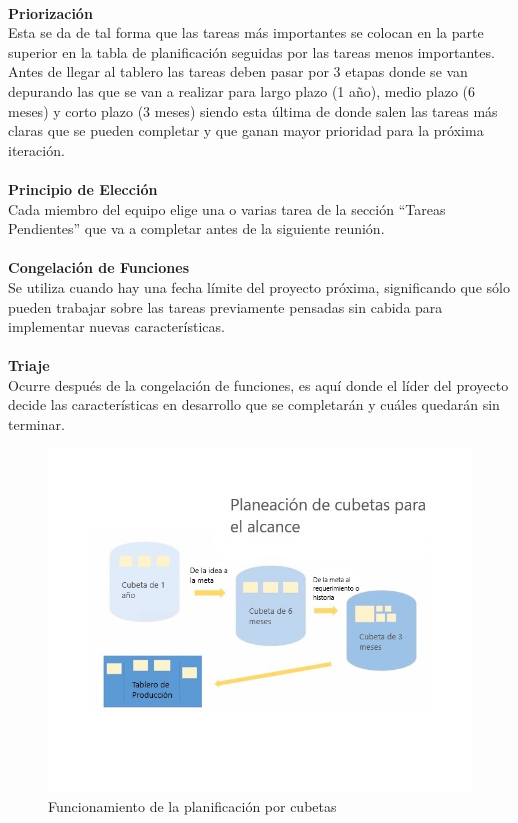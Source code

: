 \documentclass[12pt, a4paper, titlepage]{report}
\begin{document}
	    \\
	     \textbf{Priorización}\\
	    Esta se da de tal forma que las tareas más importantes se colocan en la parte superior en la tabla de planificación seguidas por las tareas menos importantes.\\
	    Antes de llegar al tablero las tareas deben pasar por 3 etapas donde se van depurando las que se van a realizar para largo plazo (1 año), medio plazo (6 meses) y corto plazo (3 meses) siendo esta última de donde salen las tareas más claras que se pueden completar y que ganan mayor prioridad para la próxima iteración.\\
	    \\
	     \textbf{Principio de Elección}\\
	    Cada miembro del equipo elige una o varias tarea de la sección “Tareas Pendientes” que va a completar antes de la siguiente reunión.\\
	    \\
	     \textbf{Congelación de Funciones}\\
	    Se utiliza cuando hay una fecha límite del proyecto próxima, significando que sólo pueden trabajar sobre las tareas previamente pensadas sin cabida para implementar nuevas características.\\
	    \\
	     \textbf{Triaje}\\
	    Ocurre después de la congelación de funciones, es aquí donde el líder del proyecto decide las características en desarrollo que se completarán y cuáles quedarán sin terminar.\\
	    
	    \begin{figure}[H] 
	    	\includegraphics[width=12cm]{./imagenes/Introduccion/scrumban_buckets.jpg}
	    	\centering \caption{Funcionamiento de la planificación por cubetas}
	    \end{figure}
    
\end{document}
